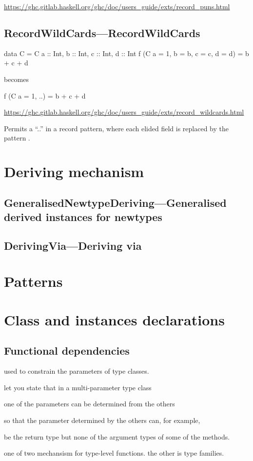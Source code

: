 \documentclass[openany, 12pt]{book}
\begin{document}
\begin{haskell}{}
\url{https://ghc.gitlab.haskell.org/ghc/doc/users_guide/exts/record_puns.html}

\chapter{RecordWildCards---RecordWildCards}
\begin{haskell}{}
data C = C {a :: Int, b :: Int, c :: Int, d :: Int}
f (C {a = 1, b = b, c = c, d = d}) = b + c + d
\end{haskell}
becomes

\begin{haskell}{}
f (C {a = 1, ..}) = b + c + d
\end{haskell}
\url{https://ghc.gitlab.haskell.org/ghc/doc/users_guide/exts/record_wildcards.html}

Permits a “..” in a record pattern, where each elided field  is replaced by the
pattern .


\part{Deriving mechanism}
\setcounter{chapter}{4}
\chapter{GeneralisedNewtypeDeriving---Generalised derived instances for newtypes}

\setcounter{chapter}{7}
\chapter{DerivingVia---Deriving via}

\part{Patterns}
\part{Class and instances declarations}

\setcounter{chapter}{6}
\chapter{Functional dependencies}
\begin{alist}
	\item used to constrain the parameters of type classes.
	\item let you state that in a multi-parameter type class
	\item one of the parameters can be determined from the others
	\item so that the parameter determined by the others can, for example,
	\item be the return type but none of the argument types of some of the methods.
	\item one of two mechansism for type-level functions. the other is type
	families.
\end{alist}


\end{haskell}
\end{document}
